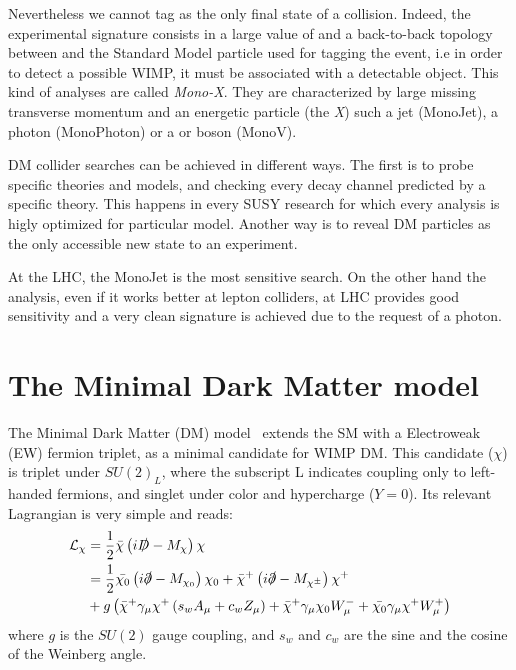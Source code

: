 Nevertheless we cannot tag \met as the only final state of a collision. Indeed, the experimental signature consists in a large value of \met and a back-to-back topology between \met and the Standard Model particle used for tagging the event, i.e in order to detect a possible WIMP, it must be associated with a detectable object. This kind of analyses are called \emph{Mono-X}. They are characterized by large missing transverse momentum and an energetic particle (the \emph{X}) such a jet (MonoJet), a photon (MonoPhoton) or a \Wboson or \Zboson boson (MonoV).

DM collider searches can be achieved in different ways. The first is to probe specific theories and models, and checking every decay channel predicted by a specific theory. This happens in every SUSY research for which every analysis is higly optimized for particular model. Another way is to reveal DM particles as the only accessible new state to an experiment.


At the LHC, the MonoJet is the most sensitive search. On the other hand the \mph analysis, even if it works better at lepton colliders, at LHC provides good sensitivity and a very clean signature is achieved due to the request of a photon.

\section{The Minimal Dark Matter model}
The Minimal Dark Matter (DM) model~\cite{Cirelli:paper} extends the SM with a Electroweak (EW) fermion triplet, as a minimal candidate for WIMP DM. This candidate ($\chi$) is triplet under $SU(2)_L$, where the subscript L indicates coupling only to left-handed fermions, and singlet under color and hypercharge ($Y=0$). Its relevant Lagrangian is very simple and reads:
\begin{equation}
\begin{split}
\mathcal{L}_\chi&=\frac{1}{2}\bar{\chi}\left(i\slashed{D}-M_\chi\right)\chi \\
			&= \frac{1}{2}\bar{\chi_0}\left(i\slashed{\partial}-M_{\chi_0}\right)\chi_0+\bar{\chi}^+\left(i\slashed{\partial}-M_{\chi^\pm}\right)\chi^+ \\
			&+ g \left(\bar{\chi}^+\gamma_\mu\chi^+\left(s_w A_\mu + c_w Z_\mu \right) +\bar{\chi}^+ \gamma_\mu\chi_0W^-_\mu + \bar{\chi_0}\gamma_\mu\chi^+W^+_\mu \right)
\end{split}
\end{equation}
where $g$ is the $SU(2)$ gauge coupling, and $s_w$ and $c_w$ are the sine and the cosine of the Weinberg angle.

